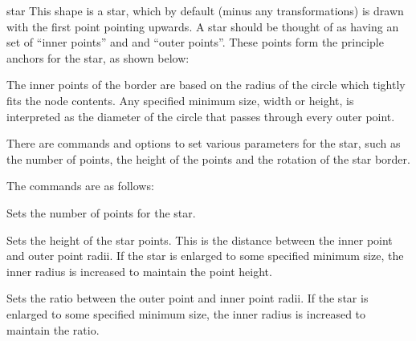 \newpage
\begin{shape}{star}
	This shape is a star, which by default (minus any transformations) is
	drawn with the first point pointing	upwards.
	A star should be thought of as having an set of ``inner points'' and
	and ``outer points''. These points form the principle anchors for the
	star, as shown below:	
	
\begin{codeexample}[]
\Huge
{}
\end{codeexample}

	The inner points of the border are based on the radius of the circle
	which tightly fits the node contents. 
	Any specified minimum size, width or height, is interpreted as the 
	diameter of the circle that passes through every outer point. 
	
	There are \pgfname{} commands and \tikzname{} options to set various
	parameters for the star, such as the number of points, the height of
	the points and the rotation of the star border. 
	
	The \pgfname{}	commands are as follows:

	\begin{command}{\pgfsetstarpoints{}}
		Sets the number of points for the star.
	\end{command}
	
	\begin{command}{\pgfsetstarpointheight{}}
		Sets the height of the star points. This is the distance between the
		inner point and outer point radii. If the star is enlarged to some
		specified minimum size, the inner radius is increased to maintain
		the point height.	
	\end{command}

	\begin{command}{\pgfsetstarpointratio{}}
		Sets the ratio between the outer point and inner point radii.		
		If the star is enlarged to some specified minimum size, the
		inner radius is increased to maintain the ratio.	
	\end{command}
	

\end{shape}
